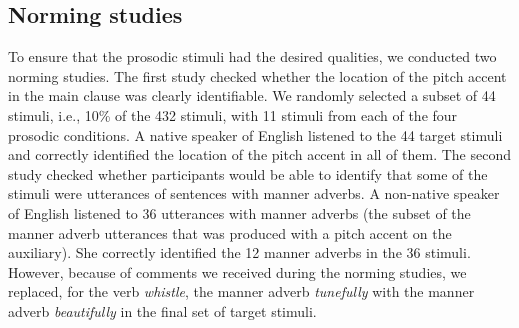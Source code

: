\documentclass[a4paper,12pt]{article}
\newcommand{\6}{\mbox{$[\hspace*{-.6mm}[$}}
\newcommand{\9}{\mbox{$]\hspace*{-.6mm}]$}}
\begin{document}
\subsection{Norming studies}\label{a-norming}

To ensure that the prosodic stimuli had the desired qualities, we conducted two norming studies. The first study checked whether the location of the pitch accent in the main clause was clearly identifiable. We randomly selected a subset of 44 stimuli, i.e., 10\% of the 432 stimuli, with 11 stimuli from each of the four prosodic conditions. A native speaker of English listened to the 44 target stimuli and correctly identified the location of the pitch accent in all of them. The second study checked whether participants would be able to identify that some of the stimuli were utterances of sentences with manner adverbs. A non-native speaker of English listened to 36 utterances with manner adverbs (the subset of the manner adverb utterances that was produced with a pitch accent on the auxiliary). She correctly identified the 12 manner adverbs in the 36 stimuli. However, because of comments we received during the norming studies, we replaced, for the verb {\em whistle}, the manner adverb {\em tunefully} with the manner adverb {\em beautifully} in the final set of target stimuli.






\end{document}
